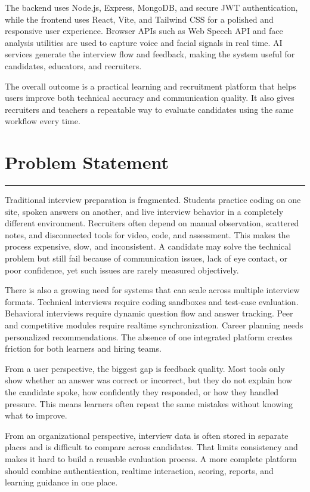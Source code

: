 ﻿\documentclass[12pt,a4paper]{article}
\newcommand{\sectionline}{\vspace{0.4em}\hrule\vspace{0.8em}}
\begin{document}
The backend uses Node.js, Express, MongoDB, and secure JWT authentication, while the frontend uses React, Vite, and Tailwind CSS for a polished and responsive user experience. Browser APIs such as Web Speech API and face analysis utilities are used to capture voice and facial signals in real time. AI services generate the interview flow and feedback, making the system useful for candidates, educators, and recruiters.

The overall outcome is a practical learning and recruitment platform that helps users improve both technical accuracy and communication quality. It also gives recruiters and teachers a repeatable way to evaluate candidates using the same workflow every time.

\clearpage

\section{Problem Statement}
\sectionline
Traditional interview preparation is fragmented. Students practice coding on one site, spoken answers on another, and live interview behavior in a completely different environment. Recruiters often depend on manual observation, scattered notes, and disconnected tools for video, code, and assessment. This makes the process expensive, slow, and inconsistent. A candidate may solve the technical problem but still fail because of communication issues, lack of eye contact, or poor confidence, yet such issues are rarely measured objectively.

There is also a growing need for systems that can scale across multiple interview formats. Technical interviews require coding sandboxes and test-case evaluation. Behavioral interviews require dynamic question flow and answer tracking. Peer and competitive modules require realtime synchronization. Career planning needs personalized recommendations. The absence of one integrated platform creates friction for both learners and hiring teams.

From a user perspective, the biggest gap is feedback quality. Most tools only show whether an answer was correct or incorrect, but they do not explain how the candidate spoke, how confidently they responded, or how they handled pressure. This means learners often repeat the same mistakes without knowing what to improve.

From an organizational perspective, interview data is often stored in separate places and is difficult to compare across candidates. That limits consistency and makes it hard to build a reusable evaluation process. A more complete platform should combine authentication, realtime interaction, scoring, reports, and learning guidance in one place.
\end{document}
